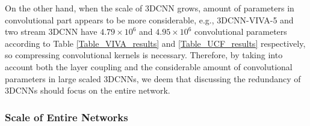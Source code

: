 \documentclass[a4paper,fleqn]{cas-dc}
\begin{document}
On the other hand, when the scale of 3DCNN grows, amount of parameters in convolutional part appears to be more considerable, e.g., 3DCNN-VIVA-5 and two stream 3DCNN have \(4.79 \times 10^6\) and \(4.95 \times 10^6\) convolutional parameters according to Table \ref{Table_VIVA_results} and \ref{Table_UCF_results} respectively, so compressing convolutional kernels is necessary. Therefore, by taking into account both the layer coupling and the considerable amount of convolutional parameters in large scaled 3DCNNs, we deem that discussing the redundancy of 3DCNNs should focus on the entire network.

\begin{table}
\caption{\textbf{Compressing different parts of 3DCNN-VIVA-1.} The ``Base'' column denotes the uncompressed network.}
\label{Table_coupling}
  \centering
  \renewcommand\arraystretch{1.6}
\end{table}

\subsubsection{Scale of Entire Networks}\quad
\end{document}
